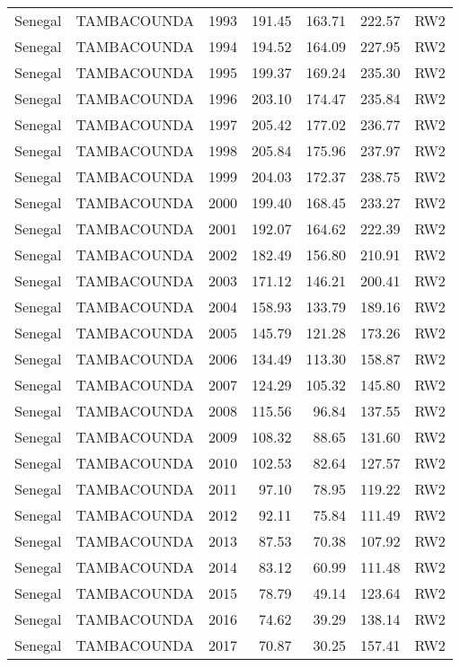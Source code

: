 \begin{longtable}{lllrrrl}
  Senegal & TAMBACOUNDA & 1993 & 191.45 & 163.71 & 222.57 & RW2 \\ 
  Senegal & TAMBACOUNDA & 1994 & 194.52 & 164.09 & 227.95 & RW2 \\ 
  Senegal & TAMBACOUNDA & 1995 & 199.37 & 169.24 & 235.30 & RW2 \\ 
  Senegal & TAMBACOUNDA & 1996 & 203.10 & 174.47 & 235.84 & RW2 \\ 
  Senegal & TAMBACOUNDA & 1997 & 205.42 & 177.02 & 236.77 & RW2 \\ 
  Senegal & TAMBACOUNDA & 1998 & 205.84 & 175.96 & 237.97 & RW2 \\ 
  Senegal & TAMBACOUNDA & 1999 & 204.03 & 172.37 & 238.75 & RW2 \\ 
  Senegal & TAMBACOUNDA & 2000 & 199.40 & 168.45 & 233.27 & RW2 \\ 
  Senegal & TAMBACOUNDA & 2001 & 192.07 & 164.62 & 222.39 & RW2 \\ 
  Senegal & TAMBACOUNDA & 2002 & 182.49 & 156.80 & 210.91 & RW2 \\ 
  Senegal & TAMBACOUNDA & 2003 & 171.12 & 146.21 & 200.41 & RW2 \\ 
  Senegal & TAMBACOUNDA & 2004 & 158.93 & 133.79 & 189.16 & RW2 \\ 
  Senegal & TAMBACOUNDA & 2005 & 145.79 & 121.28 & 173.26 & RW2 \\ 
  Senegal & TAMBACOUNDA & 2006 & 134.49 & 113.30 & 158.87 & RW2 \\ 
  Senegal & TAMBACOUNDA & 2007 & 124.29 & 105.32 & 145.80 & RW2 \\ 
  Senegal & TAMBACOUNDA & 2008 & 115.56 & 96.84 & 137.55 & RW2 \\ 
  Senegal & TAMBACOUNDA & 2009 & 108.32 & 88.65 & 131.60 & RW2 \\ 
  Senegal & TAMBACOUNDA & 2010 & 102.53 & 82.64 & 127.57 & RW2 \\ 
  Senegal & TAMBACOUNDA & 2011 & 97.10 & 78.95 & 119.22 & RW2 \\ 
  Senegal & TAMBACOUNDA & 2012 & 92.11 & 75.84 & 111.49 & RW2 \\ 
  Senegal & TAMBACOUNDA & 2013 & 87.53 & 70.38 & 107.92 & RW2 \\ 
  Senegal & TAMBACOUNDA & 2014 & 83.12 & 60.99 & 111.48 & RW2 \\ 
  Senegal & TAMBACOUNDA & 2015 & 78.79 & 49.14 & 123.64 & RW2 \\ 
  Senegal & TAMBACOUNDA & 2016 & 74.62 & 39.29 & 138.14 & RW2 \\ 
  Senegal & TAMBACOUNDA & 2017 & 70.87 & 30.25 & 157.41 & RW2 \\ 

\end{longtable}

